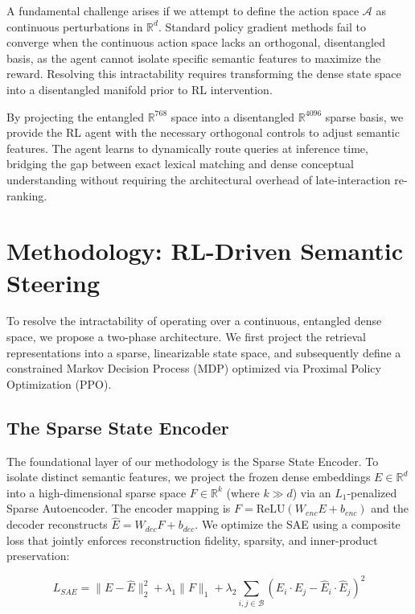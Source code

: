 \documentclass[sigconf]{acmart}
\begin{document}
A fundamental challenge arises if we attempt to define the action space $\mathcal{A}$ as continuous perturbations in $\mathbb{R}^d$. Standard policy gradient methods fail to converge when the continuous action space lacks an orthogonal, disentangled basis, as the agent cannot isolate specific semantic features to maximize the reward. Resolving this intractability requires transforming the dense state space into a disentangled manifold prior to RL intervention.

By projecting the entangled $\mathbb{R}^{768}$ space into a disentangled $\mathbb{R}^{4096}$ sparse basis, we provide the RL agent with the necessary orthogonal controls to adjust semantic features. The agent learns to dynamically route queries at inference time, bridging the gap between exact lexical matching and dense conceptual understanding without requiring the architectural overhead of late-interaction re-ranking.

\section{Methodology: RL-Driven Semantic Steering}

To resolve the intractability of operating over a continuous, entangled dense space, we propose a two-phase architecture. We first project the retrieval representations into a sparse, linearizable state space, and subsequently define a constrained Markov Decision Process (MDP) optimized via Proximal Policy Optimization (PPO).

\subsection{The Sparse State Encoder}

The foundational layer of our methodology is the Sparse State Encoder. To isolate distinct semantic features, we project the frozen dense embeddings $E \in \mathbb{R}^d$ into a high-dimensional sparse space $F \in \mathbb{R}^k$ (where $k \gg d$) via an $L_1$-penalized Sparse Autoencoder. The encoder mapping is $F = \text{ReLU}(W_{enc}E + b_{enc})$ and the decoder reconstructs $\hat{E} = W_{dec}F + b_{dec}$. We optimize the SAE using a composite loss that jointly enforces reconstruction fidelity, sparsity, and inner-product preservation:

\begin{equation}
L_{SAE} = \|E - \hat{E}\|_2^2 + \lambda_1 \|F\|_1 + \lambda_2 \sum_{i,j \in \mathcal{B}} (E_i \cdot E_j - \hat{E}_i \cdot \hat{E}_j)^2
\end{equation}
\end{document}
